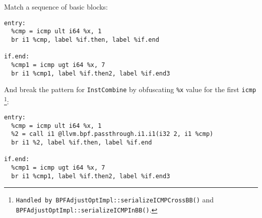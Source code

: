 \documentclass{beamer}
\newcommand{\code}[1]{\texttt{#1}}
\begin{document}
\begin{frame}
Match a sequence of basic blocks:

\begin{verbatim}
entry:
  %cmp = icmp ult i64 %x, 1
  br i1 %cmp, label %if.then, label %if.end

if.end:
  %cmp1 = icmp ugt i64 %x, 7
  br i1 %cmp1, label %if.then2, label %if.end3
\end{verbatim}

  \framebreak

  And break the pattern for \code{InstCombine} by obfuscating
  \code{\%x} value for the first \code{icmp}
  \footnote{\tiny{\parbox{\textwidth}{
        \code{Handled by BPFAdjustOptImpl::serializeICMPCrossBB()} and\\
        \code{BPFAdjustOptImpl::serializeICMPInBB()}.  }}}:

\begin{verbatim}
entry:
  %cmp = icmp ult i64 %x, 1
  %2 = call i1 @llvm.bpf.passthrough.i1.i1(i32 2, i1 %cmp)
  br i1 %2, label %if.then, label %if.end

if.end:
  %cmp1 = icmp ugt i64 %x, 7
  br i1 %cmp1, label %if.then2, label %if.end3
\end{verbatim}
    
\end{frame}
\end{document}
